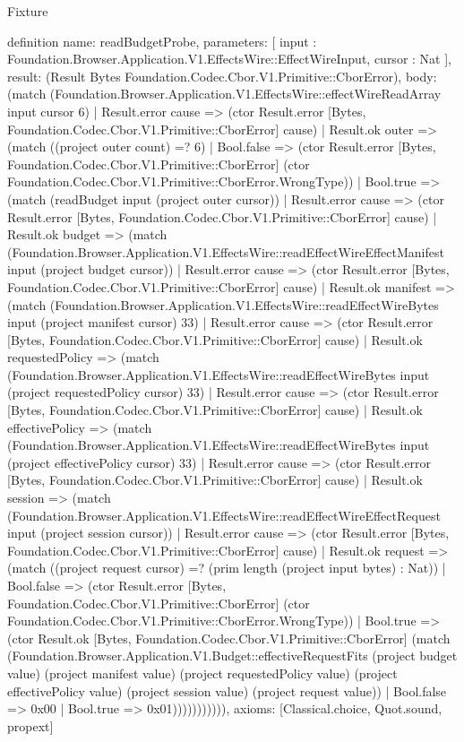 \begin{lexlean}{Fixture}
\begin{semanticmodule}
definition{
  name: readBudgetProbe,
  parameters: [
    input : Foundation.Browser.Application.V1.EffectsWire::EffectWireInput,
    cursor : Nat
  ],
  result: (Result Bytes Foundation.Codec.Cbor.V1.Primitive::CborError),
  body: (match (Foundation.Browser.Application.V1.EffectsWire::effectWireReadArray input cursor 6)
    | Result.error cause => (ctor Result.error [Bytes, Foundation.Codec.Cbor.V1.Primitive::CborError] cause)
    | Result.ok outer => (match ((project outer count) =? 6)
      | Bool.false => (ctor Result.error [Bytes, Foundation.Codec.Cbor.V1.Primitive::CborError] (ctor Foundation.Codec.Cbor.V1.Primitive::CborError.WrongType))
      | Bool.true => (match (readBudget input (project outer cursor))
        | Result.error cause => (ctor Result.error [Bytes, Foundation.Codec.Cbor.V1.Primitive::CborError] cause)
        | Result.ok budget => (match (Foundation.Browser.Application.V1.EffectsWire::readEffectWireEffectManifest input (project budget cursor))
          | Result.error cause => (ctor Result.error [Bytes, Foundation.Codec.Cbor.V1.Primitive::CborError] cause)
          | Result.ok manifest => (match (Foundation.Browser.Application.V1.EffectsWire::readEffectWireBytes input (project manifest cursor) 33)
            | Result.error cause => (ctor Result.error [Bytes, Foundation.Codec.Cbor.V1.Primitive::CborError] cause)
            | Result.ok requestedPolicy => (match (Foundation.Browser.Application.V1.EffectsWire::readEffectWireBytes input (project requestedPolicy cursor) 33)
              | Result.error cause => (ctor Result.error [Bytes, Foundation.Codec.Cbor.V1.Primitive::CborError] cause)
              | Result.ok effectivePolicy => (match (Foundation.Browser.Application.V1.EffectsWire::readEffectWireBytes input (project effectivePolicy cursor) 33)
                | Result.error cause => (ctor Result.error [Bytes, Foundation.Codec.Cbor.V1.Primitive::CborError] cause)
                | Result.ok session => (match (Foundation.Browser.Application.V1.EffectsWire::readEffectWireEffectRequest input (project session cursor))
                  | Result.error cause => (ctor Result.error [Bytes, Foundation.Codec.Cbor.V1.Primitive::CborError] cause)
                  | Result.ok request => (match ((project request cursor) =? (prim length (project input bytes) : Nat))
                    | Bool.false => (ctor Result.error [Bytes, Foundation.Codec.Cbor.V1.Primitive::CborError] (ctor Foundation.Codec.Cbor.V1.Primitive::CborError.WrongType))
                    | Bool.true => (ctor Result.ok [Bytes, Foundation.Codec.Cbor.V1.Primitive::CborError] (match (Foundation.Browser.Application.V1.Budget::effectiveRequestFits (project budget value) (project manifest value) (project requestedPolicy value) (project effectivePolicy value) (project session value) (project request value))
                      | Bool.false => 0x00
                      | Bool.true => 0x01))))))))))),
  axioms: [Classical.choice, Quot.sound, propext]
}


\end{semanticmodule}
\end{lexlean}
